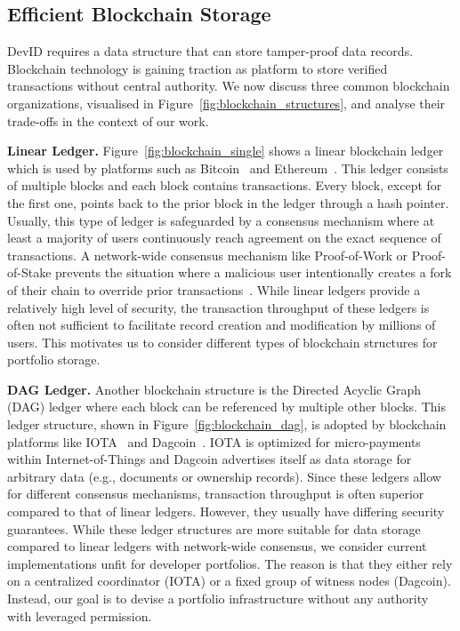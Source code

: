 \subsection{Efficient Blockchain Storage}
\label{subsec:scalable_blockchain}
DevID requires a data structure that can store tamper-proof data records.
Blockchain technology is gaining traction as platform to store verified transactions without central authority.
We now discuss three common blockchain organizations, visualised in Figure~\ref{fig:blockchain_structures}, and analyse their trade-offs in the context of our work.

\textbf{Linear Ledger.} Figure~\ref{fig:blockchain_single} shows a linear blockchain ledger which is used by platforms such as Bitcoin~\cite{nakamoto2008bitcoin} and Ethereum~\cite{wood2014ethereum}.
This ledger consists of multiple blocks and each block contains transactions.
Every block, except for the first one, points back to the prior block in the ledger through a hash pointer.
Usually, this type of ledger is safeguarded by a consensus mechanism where at least a majority of users continuously reach agreement on the exact sequence of transactions.
A network-wide consensus mechanism like Proof-of-Work or Proof-of-Stake prevents the situation where a malicious user intentionally creates a fork of their chain to override prior transactions~\cite{vukolic2015quest}.
While linear ledgers provide a relatively high level of security, the transaction throughput of these ledgers is often not sufficient to facilitate record creation and modification by millions of users.
This motivates us to consider different types of blockchain structures for portfolio storage.

\textbf{DAG Ledger.} Another blockchain structure is the Directed Acyclic Graph (DAG) ledger where each block can be referenced by multiple other blocks.
This ledger structure, shown in Figure~\ref{fig:blockchain_dag}, is adopted by blockchain platforms like IOTA~\cite{popov2018tangle} and Dagcoin~\cite{lerner2015dagcoin}.
IOTA is optimized for micro-payments within Internet-of-Things and Dagcoin advertises itself as data storage for arbitrary data (e.g., documents or ownership records).
Since these ledgers allow for different consensus mechanisms, transaction throughput is often superior compared to that of linear ledgers.
However, they usually have differing security guarantees.
While these ledger structures are more suitable for data storage compared to linear ledgers with network-wide consensus, we consider current implementations unfit for developer portfolios.
The reason is that they either rely on a centralized coordinator (IOTA) or a fixed group of witness nodes (Dagcoin).
Instead, our goal is to devise a portfolio infrastructure without any authority with leveraged permission.

